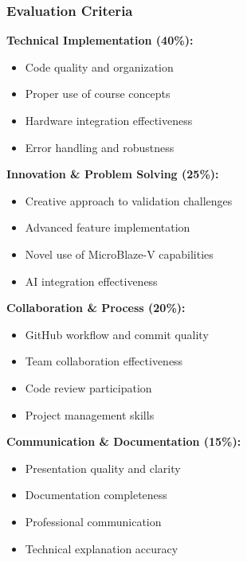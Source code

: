 \documentclass{beamer}
\begin{document}
\begin{frame}
\frametitle{Evaluation Criteria}
\textbf{Technical Implementation (40\%):}
\begin{itemize}
    \item Code quality and organization
    \item Proper use of course concepts
    \item Hardware integration effectiveness
    \item Error handling and robustness
\end{itemize}

\textbf{Innovation \& Problem Solving (25\%):}
\begin{itemize}
    \item Creative approach to validation challenges
    \item Advanced feature implementation
    \item Novel use of MicroBlaze-V capabilities
    \item AI integration effectiveness
\end{itemize}

\textbf{Collaboration \& Process (20\%):}
\begin{itemize}
    \item GitHub workflow and commit quality
    \item Team collaboration effectiveness
    \item Code review participation
    \item Project management skills
\end{itemize}

\textbf{Communication \& Documentation (15\%):}
\begin{itemize}
    \item Presentation quality and clarity
    \item Documentation completeness
    \item Professional communication
    \item Technical explanation accuracy
\end{itemize}
\end{frame}
\end{document}
